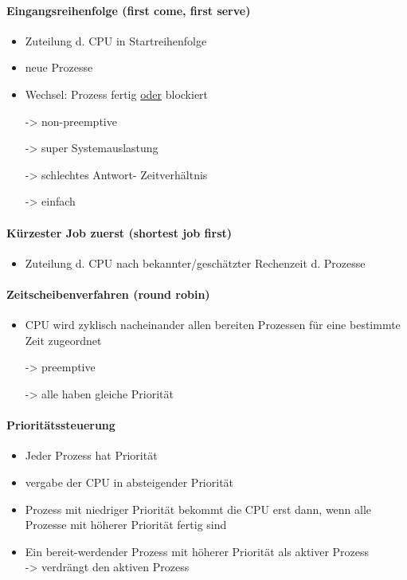 \documentclass{article}
\begin{document}
\paragraph{Eingangsreihenfolge (first come, first serve)}
\begin{itemize}
    \item Zuteilung d. CPU in Startreihenfolge
    \item neue Prozesse 
    \item Wechsel: Prozess fertig \underline{oder} blockiert
    \item[->] non-preemptive
    \item[->] super Systemauslastung
    \item[->] schlechtes Antwort- Zeitverhältnis
    \item[->] einfach
\end{itemize}

\paragraph{Kürzester Job zuerst (shortest job first)}
\begin{itemize}
    \item Zuteilung d. CPU nach bekannter/geschätzter Rechenzeit d. Prozesse
\end{itemize}

\paragraph{Zeitscheibenverfahren (round robin)}
\begin{itemize}
    \item CPU wird zyklisch nacheinander allen bereiten Prozessen für eine bestimmte Zeit zugeordnet
    \item[->] preemptive
    \item[->] alle haben gleiche Priorität
\end{itemize}

\paragraph{Prioritätssteuerung}
\begin{itemize}
    \item Jeder Prozess hat Priorität
    \item vergabe der CPU in absteigender Priorität
    \item Prozess mit niedriger Priorität bekommt die CPU erst dann, wenn alle Prozesse mit höherer Priorität fertig sind
    \item Ein bereit-werdender Prozess mit höherer Priorität als aktiver Prozess \\
          \hspace*{2em} -> verdrängt den aktiven Prozess
\end{itemize}
\end{document}
